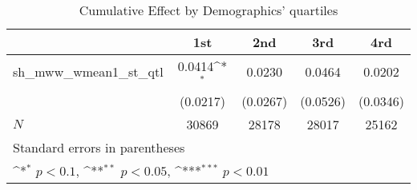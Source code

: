 \begin{table}[htbp]\centering
\def\sym#1{\ifmmode^{#1}\else\(^{#1}\)\fi}
\caption{Cumulative Effect by Demographics' quartiles}
\begin{tabular}{l*{4}{c}}
\hline\hline
            &\multicolumn{1}{c}{1st}&\multicolumn{1}{c}{2nd}&\multicolumn{1}{c}{3rd}&\multicolumn{1}{c}{4rd}\\
\hline
sh\_mww\_wmean1\_st\_qtl&      0.0414\sym{*}  &      0.0230         &      0.0464         &      0.0202         \\
            &    (0.0217)         &    (0.0267)         &    (0.0526)         &    (0.0346)         \\
\hline
\(N\)       &       30869         &       28178         &       28017         &       25162         \\
\hline\hline
\multicolumn{5}{l}{\footnotesize Standard errors in parentheses}\\
\multicolumn{5}{l}{\footnotesize \sym{*} \(p<0.1\), \sym{**} \(p<0.05\), \sym{***} \(p<0.01\)}\\
\end{tabular}
\end{table}
